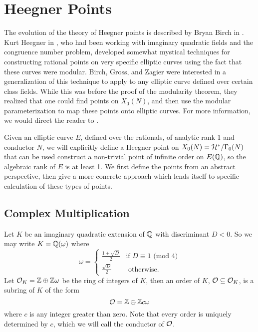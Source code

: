 \chapter{Heegner Points} \label{heegner}
The evolution of the theory of Heegner points is described by Bryan Birch in \cite{Birch}.  Kurt Heegner in \cite{Heegner}, who had been working with imaginary quadratic fields and the congruence number problem, developed somewhat mystical techniques for constructing rational points on very specific elliptic curves using the fact that these curves were modular. Birch, Gross, and Zagier were interested in a generalization of this technique to apply to any elliptic curve defined over certain class fields. While this was before the proof of the modularity theorem, they realized that one could find points on $X_0(N)$, and then use the modular parameterization to map these points onto elliptic curves. For more information, we would direct the reader to \cite{Birch1, MR0384805, MR1839918}.

Given an elliptic curve $E$, defined over the rationals, of analytic rank 1 and conductor $N$, we will explicitly define a Heegner point on $X_0(N) = \mathcal{H}^*/\Gamma_0(N)$ that can be used construct a non-trivial point of infinite order on $E(\mathbb{Q})$, so the algebraic rank of $E$ is at least 1. We first define the points from an abstract perspective, then give a more concrete approach which lends itself to specific calculation of these types of points. 
\section{Complex Multiplication}
Let $K$ be an imaginary quadratic extension of $\mathbb{Q}$ with discriminant $D < 0$. So we may write $K = \mathbb{Q}(\omega)$ where
$$
\omega = \left\{
	\begin{array}{ll}
		\frac{1+\sqrt{D}}{2} & \mbox{if } D \equiv 1 \text{ (mod 4)}\\
		\frac{\sqrt{D}}{2} & \mbox{ otherwise}.
	\end{array}
\right.
$$
Let $\mathcal{O}_K = \mathbb{Z} \oplus \mathbb{Z}{\omega}$ be the ring of integers of $K$, then an order of $K$, $\mathcal{O} \subseteq \mathcal{O}_K$, is a subring of $K$ of the form
$$\mathcal{O} = \mathbb{Z} \oplus \mathbb{Z}{c\omega}$$
where $c$ is any integer greater than zero. Note that every order is uniquely determined by $c$, which we will call the conductor of $\mathcal{O}$.

